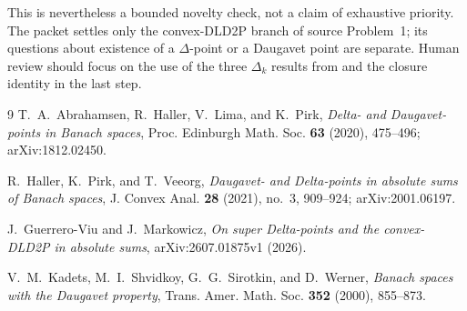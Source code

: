 \documentclass[11pt]{article}
\begin{document}
This is nevertheless a bounded novelty check, not a claim of exhaustive
priority.  The packet settles only the convex-DLD2P branch of source
Problem~1; its questions about existence of a $\Delta$-point or a Daugavet
point are separate.  Human review should focus on the use of the three
$\Delta_k$ results from \cite{HPV} and the closure identity in the last step.

\begin{thebibliography}{9}
T.~A.~Abrahamsen, R.~Haller, V.~Lima, and K.~Pirk,
\emph{Delta- and Daugavet-points in Banach spaces},
Proc. Edinburgh Math. Soc. \textbf{63} (2020), 475--496;
arXiv:1812.02450.

R.~Haller, K.~Pirk, and T.~Veeorg,
\emph{Daugavet- and Delta-points in absolute sums of Banach spaces},
J. Convex Anal. \textbf{28} (2021), no.~3, 909--924;
arXiv:2001.06197.

J.~Guerrero-Viu and J.~Markowicz,
\emph{On super Delta-points and the convex-DLD2P in absolute sums},
arXiv:2607.01875v1 (2026).

V.~M.~Kadets, M.~I.~Shvidkoy, G.~G.~Sirotkin, and D.~Werner,
\emph{Banach spaces with the Daugavet property},
Trans. Amer. Math. Soc. \textbf{352} (2000), 855--873.
\end{thebibliography}
\end{document}
